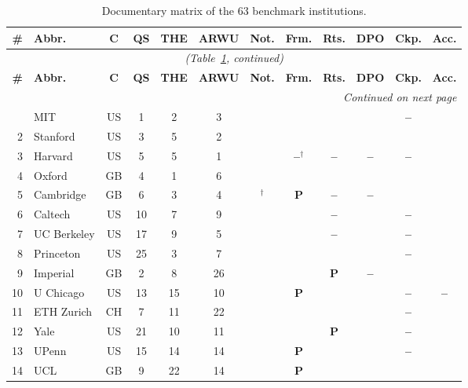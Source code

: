 \documentclass[pdflatex,sn-basic,Numbered,iicol]{sn-jnl}
\newcommand{\si}{\ding{51}}
\newcommand{\no}{\textcolor{gris}{\textbf{--}}}
\newcommand{\pc}{\textbf{P}}
\theoremstyle{thmstyleone}
\theoremstyle{thmstyletwo}
\theoremstyle{thmstylethree}
\begin{document}
\begin{appendices}
		\scriptsize
		\setlength{\tabcolsep}{2.6pt}
		\begin{longtable}{@{}r l c c c c c c c c c c@{}}
			\caption{Documentary matrix of the 63 benchmark institutions.}\label{tab:mundo}\\
			\toprule
			\textbf{\#} & \textbf{Abbr.} & \textbf{C} & \textbf{QS} & \textbf{THE} & \textbf{ARWU} & \textbf{Not.} & \textbf{Frm.} & \textbf{Rts.} & \textbf{DPO} & \textbf{Ckp.} & \textbf{Acc.} \\
			\midrule
			\endfirsthead
			\multicolumn{12}{c}{\textit{(Table~\ref{tab:mundo}, continued)}}\\
			\toprule
			\textbf{\#} & \textbf{Abbr.} & \textbf{C} & \textbf{QS} & \textbf{THE} & \textbf{ARWU} & \textbf{Not.} & \textbf{Frm.} & \textbf{Rts.} & \textbf{DPO} & \textbf{Ckp.} & \textbf{Acc.} \\
			\midrule
			\endhead
			\midrule
			\multicolumn{12}{r}{\textit{Continued on next page}}\\
			\endfoot
			\bottomrule
			\endlastfoot
			1 & MIT & US & 1 & 2 & 3 & \si & \si & \si & \si & \no & \si \\
			2 & Stanford & US & 3 & 5 & 2 & \si & \si & \si & \si & \si & \si \\
			3 & Harvard & US & 5 & 5 & 1 & \si & \no$^\dagger$ & \no & \no & \no & \si \\
			4 & Oxford & GB & 4 & 1 & 6 & \si & \si & \si & \si & \si & \si \\
			5 & Cambridge & GB & 6 & 3 & 4 & \si$^\dagger$ & \pc & \no & \no & \si & \si \\
			6 & Caltech & US & 10 & 7 & 9 & \si & \si & \no & \si & \no & \si \\
			7 & UC Berkeley & US & 17 & 9 & 5 & \si & \si & \no & \si & \no & \si \\
			8 & Princeton & US & 25 & 3 & 7 & \si & \si & \si & \si & \no & \si \\
			9 & Imperial & GB & 2 & 8 & 26 & \si & \si & \pc & \no & \si & \si \\
			10 & U Chicago & US & 13 & 15 & 10 & \si & \pc & \si & \si & \no & \no \\
			11 & ETH Zurich & CH & 7 & 11 & 22 & \si & \si & \si & \si & \no & \si \\
			12 & Yale & US & 21 & 10 & 11 & \si & \si & \pc & \si & \no & \si \\
			13 & UPenn & US & 15 & 14 & 14 & \si & \pc & \si & \si & \no & \si \\
			14 & UCL & GB & 9 & 22 & 14 & \si & \pc & \si & \si & \si & \si \\

\end{longtable}
\end{appendices}
\end{document}
